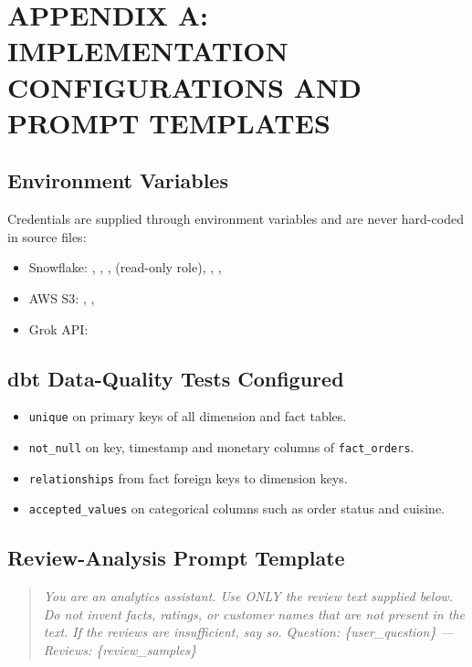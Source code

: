 \documentclass[12pt,a4paper]{report}
\begin{document}
\chapter*{APPENDIX A: IMPLEMENTATION CONFIGURATIONS AND PROMPT TEMPLATES}

\section{Environment Variables}
Credentials are supplied through environment variables and are never hard-coded in source files:
\begin{itemize}[leftmargin=2em]
\item Snowflake: , , ,  (read-only role), , , 
\item AWS S3: , , 
\item Grok API: 
\end{itemize}

\section{dbt Data-Quality Tests Configured}
\begin{itemize}[leftmargin=2em]
\item \texttt{unique} on primary keys of all dimension and fact tables.
\item \texttt{not\_null} on key, timestamp and monetary columns of \texttt{fact\_orders}.
\item \texttt{relationships} from fact foreign keys to dimension keys.
\item \texttt{accepted\_values} on categorical columns such as order status and cuisine.
\end{itemize}

\section{Review-Analysis Prompt Template}
\begin{quote}
\small\itshape You are an analytics assistant. Use ONLY the review text supplied below. Do not invent facts, ratings, or customer names that are not present in the text. If the reviews are insufficient, say so. Question: \{user\_question\} --- Reviews: \{review\_samples\}
\end{quote}
\end{document}
